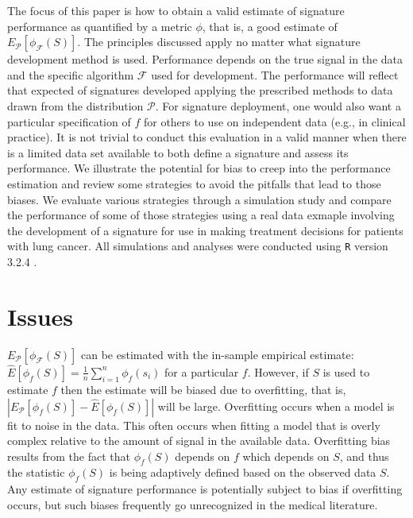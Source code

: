 \documentclass[11pt,]{article}
\begin{document}
The focus of this paper is how to obtain a valid estimate of signature
performance as quantified by a metric \(\phi\), that is, a good estimate
of \(E_\mathcal{P}[\phi_\mathcal{F}(S)]\). The principles discussed
apply no matter what signature development method is used. Performance
depends on the true signal in the data and the specific algorithm
\(\mathcal{F}\) used for development. The performance will reflect that
expected of signatures developed applying the prescribed methods to data
drawn from the distribution \(\mathcal{P}\). For signature deployment,
one would also want a particular specification of \(f\) for others to
use on independent data (e.g., in clinical practice). It is not trivial
to conduct this evaluation in a valid manner when there is a limited
data set available to both define a signature and assess its
performance. We illustrate the potential for bias to creep into the
performance estimation and review some strategies to avoid the pitfalls
that lead to those biases. We evaluate various strategies through a
simulation study and compare the performance of some of those strategies
using a real data exmaple involving the development of a signature for
use in making treatment decisions for patients with lung cancer. All
simulations and analyses were conducted using \texttt{R} version 3.2.4
\citep{arr}.

\section{Issues}\label{issues}

\(E_\mathcal{P}[\phi_\mathcal{F}(S)]\) can be estimated with the
in-sample empirical estimate:
\(\hat{E}[\phi_f(S)] = \frac{1}{n}\sum_{i=1}^n\phi_f(s_i)\) for a
particular \(f\). However, if \(S\) is used to estimate \(f\) then the
estimate will be biased due to overfitting, that is,
\(|E_\mathcal{P}[\phi_f(S)] - \hat{E}[\phi_f(S)]|\) will be large.
Overfitting occurs when a model is fit to noise in the data. This often
occurs when fitting a model that is overly complex relative to the
amount of signal in the available data. Overfitting bias results from
the fact that \(\phi_f(S)\) depends on \(f\) which depends on \(S\), and
thus the statistic \(\phi_f(S)\) is being adaptively defined based on
the observed data \(S\). Any estimate of signature performance is
potentially subject to bias if overfitting occurs, but such biases
frequently go unrecognized in the medical literature.
\end{document}
